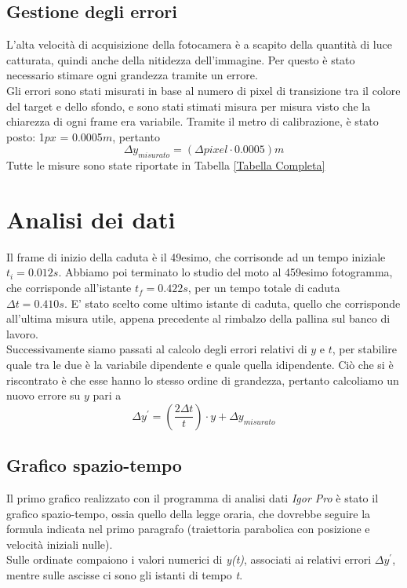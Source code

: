 \documentclass[12pt, a4paper]{article}
\begin{document}
\subsection{Gestione degli errori}
L'alta velocità di acquisizione della fotocamera è a scapito della quantità di luce catturata, quindi anche della nitidezza dell'immagine. Per questo è stato necessario stimare ogni grandezza tramite un errore. \\
Gli errori sono stati misurati in base al numero di pixel di transizione tra il colore del target e dello sfondo, e sono stati stimati misura per misura visto che la chiarezza di ogni frame era variabile. Tramite il metro di calibrazione, è stato posto: 1$px$ = 0.0005$m$, pertanto
\begin{equation*}
    \Delta y_{misurato}= (\Delta pixel \cdot 0.0005)m
\end{equation*}
\bigskip
Tutte le misure sono state riportate in Tabella \ref{Tabella Completa}

\section{Analisi dei dati}
Il frame di inizio della caduta è il 49esimo, che corrisonde ad un tempo iniziale \textit{$t_i = 0.012s$}.
Abbiamo poi terminato lo studio del moto al 459esimo fotogramma, che corrisponde all'istante \textit{$t_f = 0.422s$}, per un tempo totale di caduta \textit{$\Delta t = 0.410s$}. 
E' stato scelto come ultimo istante di caduta, quello che corrisponde all'ultima misura utile, appena precedente al rimbalzo della pallina sul banco di lavoro.\\

Successivamente siamo passati al calcolo degli errori relativi di $y$ e $t$, per stabilire quale tra le due è la variabile dipendente e quale quella idipendente. Ciò che si è riscontrato è che esse hanno lo stesso ordine di grandezza, pertanto calcoliamo un nuovo errore su $y$ pari a 
\begin{equation*}
   \Delta y^{'} = \left(\frac{2\Delta t}{t}\right)\cdot y + \Delta y_{misurato}
\end{equation*}
\subsection{Grafico spazio-tempo}
Il primo grafico realizzato con il programma di analisi dati \textit{Igor Pro} è stato il grafico spazio-tempo, ossia quello della legge oraria, che dovrebbe seguire la formula indicata nel primo paragrafo (traiettoria parabolica con posizione e velocità iniziali nulle).\\ 
Sulle ordinate compaiono i valori numerici di \textit{y(t)}, associati ai relativi errori  \textit{$\Delta y^{'}$}, mentre sulle ascisse ci sono gli istanti di tempo \textit{t}. 
\end{document}

